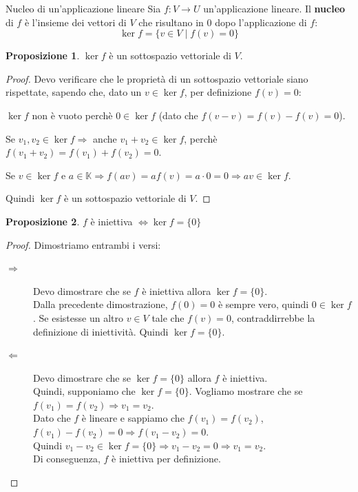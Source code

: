 \documentclass[a4paper]{article}
\theoremstyle{definition}
\newtheorem*{prop}{Proposizione}
\begin{document}
\begin{deff}{Nucleo di un'applicazione lineare}{}
	Sia $f: V \rightarrow U$ un'applicazione lineare.
	Il \textbf{nucleo} di $f$ è l'insieme dei vettori di $V$ che risultano in $0$ dopo l'applicazione di $f$:
	\[ \ker f = \{v \in V \mid f(v) = 0\} \]
\end{deff}
\begin{prop}
	$\ker f$ è un sottospazio vettoriale di $V$.
\end{prop}
\begin{proof}
	Devo verificare che le proprietà di un sottospazio vettoriale siano rispettate, sapendo che, dato un $v \in \ker f$, per definizione $f(v) = 0$:
	\begin{description}
		\item $\ker f$ non è vuoto perchè $0 \in \ker f$ (dato che $f(v - v) = f(v) - f(v) = 0$).
		\item Se $v_1, v_2 \in \ker f \Rightarrow$ anche $v_1 + v_2 \in \ker f$, perchè $f(v_1 + v_2) = f(v_1) + f(v_2) = 0$.
		\item Se $v \in \ker f$ e $a \in \mathbb{K} \Rightarrow f(av) = af(v) = a \cdot 0 = 0 \Rightarrow av \in \ker f$.
	\end{description}
	Quindi $\ker f$ è un sottospazio vettoriale di $V$.
\end{proof}
\begin{prop}
	$f$ è iniettiva $\Leftrightarrow \ker f = \{0\}$
\end{prop}
\begin{proof}
	Dimostriamo entrambi i versi:
	\begin{description}
		\item[$\Rightarrow$] Devo dimostrare che se $f$ è iniettiva allora $\ker f = \{0\}$. \\
		Dalla precedente dimostrazione, $f(0) = 0$ è sempre vero, quindi $0 \in \ker f$.
		Se esistesse un altro $v \in V$ tale che $f(v) = 0$, contraddirrebbe la definizione di iniettività.
		Quindi $\ker f = \{0\}$.
		\item[$\Leftarrow$] Devo dimostrare che se $\ker f = \{0\}$ allora $f$ è iniettiva. \\
		      Quindi, supponiamo che $\ker f = \{0\}$. Vogliamo mostrare che se $f(v_1) = f(v_2) \Rightarrow v_1 = v_2$. \\
		      Dato che $f$ è lineare e sappiamo che $f(v_1) = f(v_2)$, $f(v_1) - f(v_2) = 0 \Rightarrow f(v_1 - v_2) = 0$. \\
		      Quindi $v_1 - v_2 \in \ker f = \{0\} \Rightarrow v_1 - v_2 = 0 \Rightarrow v_1 = v_2$. \\
		      Di conseguenza, $f$ è iniettiva per definizione.
	\end{description}
\end{proof}
\end{document}
